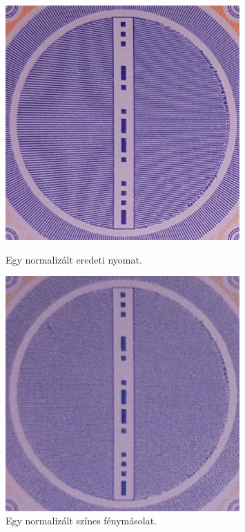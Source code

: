 \begin{figure}[h]{}
	
	\begin{minipage}[r]{0.5\linewidth}
		\centering
		\includegraphics[width=0.8\textwidth]{img/normalized-eredeti-pelda.png}
		\caption{Egy normalizált eredeti nyomat.}
		\label{fig:normalized-eredeti.pelda}
		
	\end{minipage}\hfill
	\begin{minipage}[l]{0.5\linewidth}
		\centering
		\includegraphics[width=0.8\textwidth]{img/normalized-copy-pelda.png}
		\caption{Egy normalizált színes fénymásolat.}
		\label{fig:normalized-copy.pelda}
		
	\end{minipage}
	
\end{figure}

